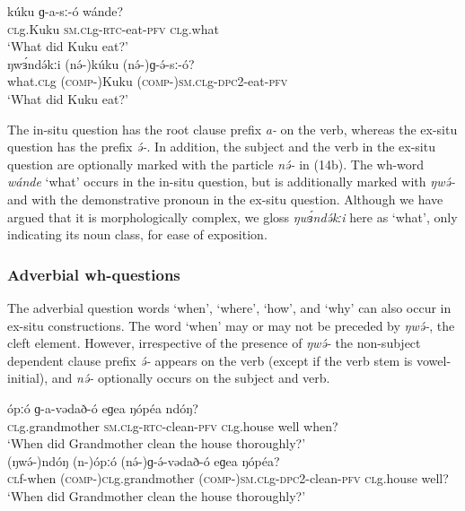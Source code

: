 \ea
\ea \gll	kúku	ɡ-a-sː-ó	wánde?\\
	\textsc{cl}g.Kuku	\textsc{sm.cl}g-\textsc{rtc}-eat-\textsc{pfv}   	\textsc{cl}g.what\\
\trans	‘What did Kuku eat?’\\
\ex \gll	ŋwɜ́ndə́kːi	(nə́-)kúku     	(nə́-)ɡ-ə́-sː-ó?                \\
	what.\textsc{cl}g	(\textsc{comp-})Kuku  	(\textsc{comp-})\textsc{sm.cl}g-\textsc{dpc}2-eat-\textsc{pfv}  \\
\trans	‘What did Kuku eat?’\\
\z
\z

The in-situ question has the root clause prefix \textit{a-} on the verb, whereas the ex-situ question has the prefix \textit{ə́-}. In addition, the subject and the verb in the ex-situ question are optionally marked with the particle \textit{nə́-} in (14b). The wh-word \textit{wánde} ‘what’ occurs in the in-situ question, but is additionally marked with \textit{ŋwə́-} and with the demonstrative pronoun in the ex-situ question. Although we have argued that it is morphologically complex, we gloss \textit{ŋwɜ́ndə́kːi} here as ‘what’, only indicating its noun class, for ease of exposition.

\subsubsection{Adverbial wh-questions}
The adverbial question words ‘when’, ‘where’, ‘how’, and ‘why’ can also occur in ex-situ constructions. The word ‘when’ may or may not be preceded by \textit{ŋwə́-}, the cleft element. However, irrespective of the presence of \textit{ŋwə́-} the non-subject dependent clause prefix \textit{ə́-} appears on the verb (except if the verb stem is vowel-initial), and \textit{nə́-} optionally occurs on the subject and verb. 

\ea
\ea
\gll	ópːó	ɡ-a-vədað-ó	eɡea        ŋópéa   ndóŋ?\\
	\textsc{cl}g.grandmother	\textsc{sm.cl}g-\textsc{rtc}-clean-\textsc{pfv}	\textsc{cl}g.house	well	when?\\
\trans		‘When did Grandmother clean the house thoroughly?’\\
\ex
\gll	(ŋwə́-)ndóŋ	(n-)ópːó	(nə́-)ɡ-ə́-vədað-ó eɡea	ŋópéa?  \\               
	\textsc{cl}f-when	(\textsc{comp-})\textsc{cl}g.grandmother	(\textsc{comp-})\textsc{sm.cl}g-\textsc{dpc}2-clean-\textsc{pfv} 
\textsc{cl}g.house	well?\\
\trans		‘When did Grandmother clean the house thoroughly?’\\
\z
\z

